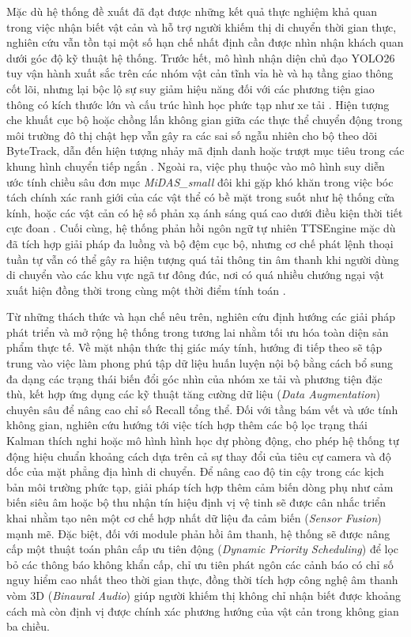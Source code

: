 Mặc dù hệ thống đề xuất đã đạt được những kết quả thực nghiệm khả quan trong việc nhận biết vật cản và hỗ trợ người khiếm thị di chuyển thời gian thực, nghiên cứu vẫn tồn tại một số hạn chế nhất định cần được nhìn nhận khách quan dưới góc độ kỹ thuật hệ thống. Trước hết, mô hình nhận diện chủ đạo YOLO26 tuy vận hành xuất sắc trên các nhóm vật cản tĩnh vỉa hè và hạ tầng giao thông cốt lõi, nhưng lại bộc lộ sự suy giảm hiệu năng đối với các phương tiện giao thông có kích thước lớn và cấu trúc hình học phức tạp như xe tải \cite{Reference3}. Hiện tượng che khuất cục bộ hoặc chồng lấn không gian giữa các thực thể chuyển động trong môi trường đô thị chật hẹp vẫn gây ra các sai số ngẫu nhiên cho bộ theo dõi ByteTrack, dẫn đến hiện tượng nhảy mã định danh hoặc trượt mục tiêu trong các khung hình chuyển tiếp ngắn \cite{Reference12}. Ngoài ra, việc phụ thuộc vào mô hình suy diễn ước tính chiều sâu đơn mục \textit{MiDAS\_small} đôi khi gặp khó khăn trong việc bóc tách chính xác ranh giới của các vật thể có bề mặt trong suốt như hệ thống cửa kính, hoặc các vật cản có hệ số phản xạ ánh sáng quá cao dưới điều kiện thời tiết cực đoan \cite{Reference11}. Cuối cùng, hệ thống phản hồi ngôn ngữ tự nhiên TTSEngine mặc dù đã tích hợp giải pháp đa luồng và bộ đệm cục bộ, nhưng cơ chế phát lệnh thoại tuần tự vẫn có thể gây ra hiện tượng quá tải thông tin âm thanh khi người dùng di chuyển vào các khu vực ngã tư đông đúc, nơi có quá nhiều chướng ngại vật xuất hiện đồng thời trong cùng một thời điểm tính toán \cite{Reference13}.

Từ những thách thức và hạn chế nêu trên, nghiên cứu định hướng các giải pháp phát triển và mở rộng hệ thống trong tương lai nhằm tối ưu hóa toàn diện sản phẩm thực tế. Về mặt nhận thức thị giác máy tính, hướng đi tiếp theo sẽ tập trung vào việc làm phong phú tập dữ liệu huấn luyện nội bộ bằng cách bổ sung đa dạng các trạng thái biến đổi góc nhìn của nhóm xe tải và phương tiện đặc thù, kết hợp ứng dụng các kỹ thuật tăng cường dữ liệu (\textit{Data Augmentation}) chuyên sâu để nâng cao chỉ số Recall tổng thể. Đối với tầng bám vết và ước tính không gian, nghiên cứu hướng tới việc tích hợp thêm các bộ lọc trạng thái Kalman thích nghi hoặc mô hình hình học dự phòng động, cho phép hệ thống tự động hiệu chuẩn khoảng cách dựa trên cả sự thay đổi của tiêu cự camera và độ dốc của mặt phẳng địa hình di chuyển. Để nâng cao độ tin cậy trong các kịch bản môi trường phức tạp, giải pháp tích hợp thêm cảm biến dòng phụ như cảm biến siêu âm hoặc bộ thu nhận tín hiệu định vị vệ tinh sẽ được cân nhắc triển khai nhằm tạo nên một cơ chế hợp nhất dữ liệu đa cảm biến (\textit{Sensor Fusion}) mạnh mẽ. Đặc biệt, đối với module phản hồi âm thanh, hệ thống sẽ được nâng cấp một thuật toán phân cấp ưu tiên động (\textit{Dynamic Priority Scheduling}) để lọc bỏ các thông báo không khẩn cấp, chỉ ưu tiên phát ngôn các cảnh báo có chỉ số nguy hiểm cao nhất theo thời gian thực, đồng thời tích hợp công nghệ âm thanh vòm 3D (\textit{Binaural Audio}) giúp người khiếm thị không chỉ nhận biết được khoảng cách mà còn định vị được chính xác phương hướng của vật cản trong không gian ba chiều.
